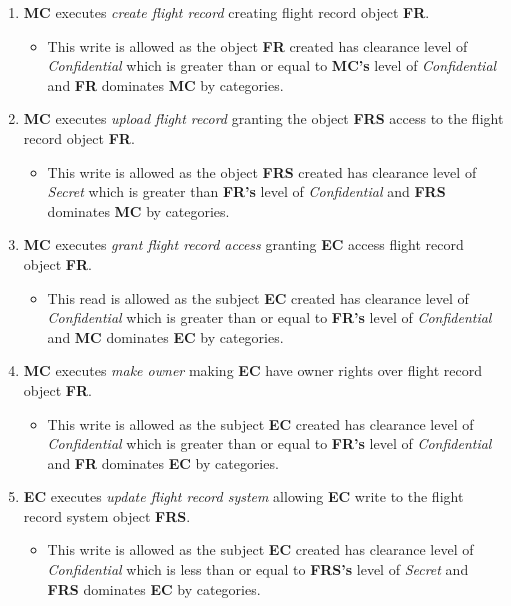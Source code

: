 \documentclass[10pt,journal,compsoc]{IEEEtran}
\begin{document}
\begin{enumerate}
  \item \textbf{MC} executes \textit{create flight record} creating flight record object \textbf{FR}.
  \begin{itemize}
    \item This write is allowed as the object \textbf{FR} created has clearance level of \textit{Confidential} which is greater than or equal to \textbf{MC's} level of \textit{Confidential} and \textbf{FR} dominates \textbf{MC} by categories.
  \end{itemize}
  \item \textbf{MC} executes \textit{upload flight record} granting the object \textbf{FRS} access to the flight record object \textbf{FR}.
  \begin{itemize}
    \item This write is allowed as the object \textbf{FRS} created has clearance level of \textit{Secret} which is greater than \textbf{FR's} level of \textit{Confidential} and \textbf{FRS} dominates \textbf{MC} by categories.
  \end{itemize}
  \item \textbf{MC} executes \textit{grant flight record access} granting \textbf{EC} access flight record object \textbf{FR}.
  \begin{itemize}
    \item This read is allowed as the subject \textbf{EC} created has clearance level of \textit{Confidential} which is greater than or equal to \textbf{FR's} level of \textit{Confidential} and \textbf{MC} dominates \textbf{EC} by categories.
  \end{itemize}
  \item \textbf{MC} executes \textit{make owner} making \textbf{EC} have owner rights over flight record object \textbf{FR}.
  \begin{itemize}
    \item This write is allowed as the subject \textbf{EC} created has clearance level of \textit{Confidential} which is greater than or equal to \textbf{FR's} level of \textit{Confidential} and \textbf{FR} dominates \textbf{EC} by categories.
  \end{itemize}
  \item \textbf{EC} executes \textit{update flight record system} allowing \textbf{EC} write to the flight record system object \textbf{FRS}.
  \begin{itemize}
    \item This write is allowed as the subject \textbf{EC} created has clearance level of \textit{Confidential} which is less than or equal to \textbf{FRS's} level of \textit{Secret} and \textbf{FRS} dominates \textbf{EC} by categories.
  \end{itemize}
\end{enumerate}
\end{document}
